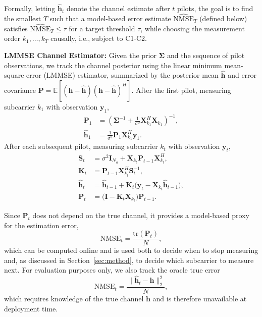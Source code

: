 \smallskip
\noindent
Formally, letting $\hat{\mathbf h}_t$ denote the channel estimate after $t$ pilots, the goal is to find the smallest $T$ such that a model-based error estimate $\widehat{\mathrm{NMSE}}_T$ (defined below) satisfies $\widehat{\mathrm{NMSE}}_T \le \tau$ for a target threshold $\tau$, while choosing the measurement order $k_1,\ldots,k_T$ causally, i.e., subject to C1-C2.

\smallskip
\noindent
{\bf LMMSE Channel Estimator:}
Given the prior $\boldsymbol\Sigma$ and the sequence of pilot observations, we track the channel posterior using the linear minimum mean-square error (LMMSE) estimator, summarized by the posterior mean $\hat{\mathbf h}$ and error covariance $\mathbf P = \mathbb E[(\mathbf h-\hat{\mathbf h})(\mathbf h-\hat{\mathbf h})^H]$. After the first pilot, measuring subcarrier $k_1$ with observation $\mathbf y_1$,
\begin{align}
\mathbf P_1 &= \left(\boldsymbol\Sigma^{-1} + \tfrac{1}{\sigma^2}\mathbf X_{k_1}^H \mathbf X_{k_1}\right)^{-1},
\label{eq:lmmse_init_P}
\\
\hat{\mathbf h}_1 &= \tfrac{1}{\sigma^2}\mathbf P_1 \mathbf X_{k_1}^H \mathbf y_1.
\label{eq:lmmse_init_h}
\end{align}
After each subsequent pilot, measuring subcarrier $k_t$ with observation $\mathbf y_t$,
\begin{align}
\mathbf S_t &= \sigma^2 \mathbf I_{N_a} + \mathbf X_{k_t} \mathbf P_{t-1} \mathbf X_{k_t}^H,
\label{eq:lmmse_S}
\\
\mathbf K_t &= \mathbf P_{t-1} \mathbf X_{k_t}^H \mathbf S_t^{-1},
\label{eq:lmmse_K}
\\
\hat{\mathbf h}_t &= \hat{\mathbf h}_{t-1} + \mathbf K_t\bigl(\mathbf y_t - \mathbf X_{k_t}\hat{\mathbf h}_{t-1}\bigr),
\label{eq:lmmse_h_update}
\\
\mathbf P_t &= \bigl(\mathbf I - \mathbf K_t \mathbf X_{k_t}\bigr)\mathbf P_{t-1}.
\label{eq:lmmse_P_update}
\end{align}

Since $\mathbf P_t$ does not depend on the true channel, it provides a model-based proxy for the estimation error,
\begin{equation}
\widehat{\mathrm{NMSE}}_t = \frac{\mathrm{tr}(\mathbf P_t)}{N},
\label{eq:nmse_hat}
\end{equation}
which can be computed online and is used both to decide when to stop measuring and, as discussed in Section~\ref{sec:method}, to decide which subcarrier to measure next. For evaluation purposes only, we also track the oracle true error
\begin{equation}
\mathrm{NMSE}_t = \frac{\|\hat{\mathbf h}_t - \mathbf h\|_2^2}{N},
\label{eq:nmse_true}
\end{equation}
which requires knowledge of the true channel $\mathbf h$ and is therefore unavailable at deployment time.
